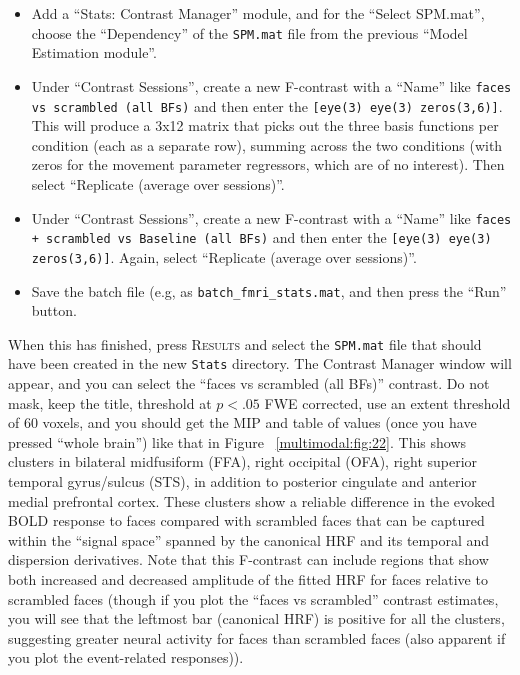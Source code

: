\begin{itemize}
\item Add a ``Stats: Contrast Manager'' module, and for the ``Select SPM.mat'', choose the ``Dependency'' of the \texttt{SPM.mat} file from the previous ``Model Estimation module''.

\item Under ``Contrast Sessions'', create a new F-contrast with a ``Name'' like \texttt{faces vs scrambled (all BFs)} and then enter the \matlab \texttt{[eye(3) eye(3) zeros(3,6)]}. This will produce a 3x12 matrix that picks out the three basis functions per condition (each as a separate row), summing across the two conditions (with zeros for the movement parameter regressors, which are of no interest). Then select ``Replicate (average over sessions)''.

\item Under ``Contrast Sessions'', create a new F-contrast with a ``Name'' like \texttt{faces + scrambled vs Baseline (all BFs)} and then enter the \matlab \texttt{[eye(3) eye(3) zeros(3,6)]}. Again, select ``Replicate (average over sessions)''.

\item Save the batch file (e.g, as \texttt{batch\_fmri\_stats.mat}, and then press the ``Run'' button.

\end{itemize}

When this has finished, press \textsc{Results} and select the \texttt{SPM.mat} file that should have been created in the new \texttt{Stats} directory. The Contrast Manager window will appear, and you can select the ``faces vs scrambled (all BFs)'' contrast. Do not mask, keep the title, threshold at $p<.05$ FWE corrected, use an extent threshold of 60 voxels, and you should get the MIP and table of values (once you have pressed ``whole brain'') like that in Figure ~\ref{multimodal:fig:22}. This shows clusters in bilateral midfusiform (FFA), right occipital (OFA), right superior temporal gyrus/sulcus (STS), in addition to posterior cingulate and anterior medial prefrontal cortex. These clusters show a reliable difference in the evoked BOLD response to faces compared with scrambled faces that can be captured within the ``signal space'' spanned by the canonical HRF and its temporal and dispersion derivatives. Note that this F-contrast can include regions that show both increased and decreased amplitude of the fitted HRF for faces relative to scrambled faces (though if you plot the ``faces vs scrambled'' contrast estimates, you will see that the leftmost bar (canonical HRF) is positive for all the clusters, suggesting greater neural activity for faces than scrambled faces (also apparent if you plot the event-related responses)).

